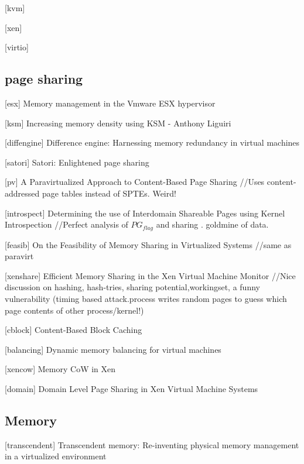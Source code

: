 \documentclass[10pt,a4paper]{article}
\begin{document}
[kvm]

[xen]

[virtio]


\subsection{page sharing}

[esx] Memory management in the Vmware ESX hypervisor 

[ksm] Increasing memory density using KSM - Anthony Liguiri

[diffengine] Difference engine: Harnessing memory redundancy in virtual machines

[satori] Satori: Enlightened page sharing

[pv] A Paravirtualized Approach to Content-Based Page Sharing 
//Uses content-addressed page tables instead of SPTEs. Weird!

[introspect] Determining the use of Interdomain Shareable Pages using Kernel Introspection
//Perfect analysis of $PG_{flag}$ and sharing . goldmine of data.

[feasib] On the Feasibility of Memory Sharing in Virtualized Systems
//same as paravirt

[xenshare] Efficient Memory Sharing in the Xen Virtual Machine Monitor 
//Nice discussion on hashing, hash-tries, sharing potential,workingset, a funny
vulnerability (timing based attack.process writes random pages to
guess which page contents of other process/kernel!)

[cblock] Content-Based Block Caching

[balancing] Dynamic memory balancing for virtual machines

[xencow] Memory CoW in Xen

[domain] Domain Level Page Sharing in Xen Virtual Machine Systems

\subsection{Memory}

[transcendent] Transcendent memory: Re-inventing physical memory management in a virtualized environment
\end{document}
